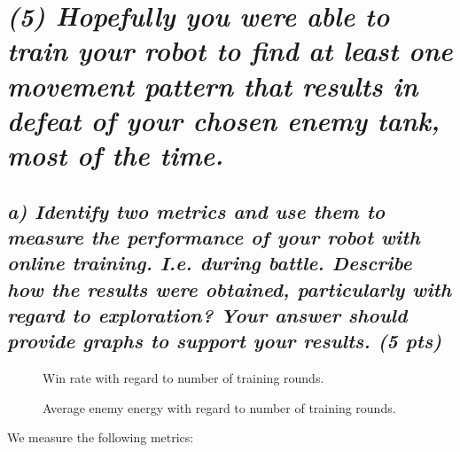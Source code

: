\documentclass[a4paper,12pt]{article}
\begin{document}
\pagebreak
\section*{\emph{(5) Hopefully you were able to train your robot to find at least one movement pattern that results in defeat of your chosen enemy tank, most of the time.}}

\subsection*{\emph{a) Identify two metrics and use them to measure the performance of your robot with online training. I.e. during battle. Describe how the results were obtained, particularly with regard to exploration? Your answer should provide graphs to support your results. (5 pts)}}

\begin{figure}[hbt!]
\caption{Win rate with regard to number of training rounds.}
\label{fig:win_rate_w1g9}

\end{figure}

\begin{figure}[hbt!]
\caption{Average enemy energy with regard to number of training rounds.}
\label{fig:energy_w1g9}
\end{figure}

We measure the following metrics:
\end{document}
